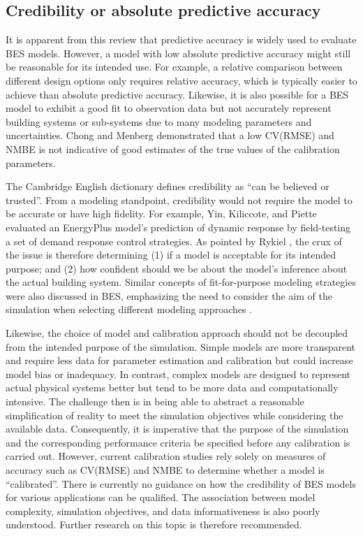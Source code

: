 \documentclass[review]{elsarticle}
\begin{document}
\subsection{Credibility or absolute predictive accuracy} \label{sec:credibility}

It is apparent from this review that predictive accuracy is widely used to evaluate BES models. However, a model with low absolute predictive accuracy might still be reasonable for its intended use. For example, a relative comparison between different design options only requires relative accuracy, which is typically easier to achieve than absolute predictive accuracy. Likewise, it is also possible for a BES model to exhibit a good fit to observation data but not accurately represent building systems or sub-systems due to many modeling parameters and uncertainties. Chong and Menberg \cite{chong2018guidelines} demonstrated that a low CV(RMSE) and NMBE is not indicative of good estimates of the true values of the calibration parameters. 

The Cambridge English dictionary defines credibility as ``can be believed or trusted''. From a modeling standpoint, credibility would not require the model to be accurate or have high fidelity. For example, Yin, Kiliccote, and Piette \cite{yin2016linking} evaluated an EnergyPlus model's prediction of dynamic response by field-testing a set of demand response control strategies. As pointed by Rykiel \cite{rykiel1996testing}, the crux of the issue is therefore determining (1) if a model is acceptable for its intended purpose; and (2) how confident should we be about the model's inference about the actual building system. Similar concepts of fit-for-purpose modeling strategies were also discussed in BES, emphasizing the need to consider the aim of the simulation when selecting different modeling approaches \cite{trvcka2010overview, gaetani2016occupant, gaetani2020stepwise, chong2021occupancy, zhan2021data}. 

Likewise, the choice of model and calibration approach should not be decoupled from the intended purpose of the simulation. Simple models are more transparent and require less data for parameter estimation and calibration but could increase model bias or inadequacy. In contrast, complex models are designed to represent actual physical systems better but tend to be more data and computationally intensive. The challenge then is in being able to abstract a reasonable simplification of reality to meet the simulation objectives while considering the available data. Consequently, it is imperative that the purpose of the simulation and the corresponding performance criteria be specified before any calibration is carried out. However, current calibration studies rely solely on measures of accuracy such as CV(RMSE) and NMBE to determine whether a model is ``calibrated''. There is currently no guidance on how the credibility of BES models for various applications can be qualified. The association between model complexity, simulation objectives, and data informativeness is also poorly understood. Further research on this topic is therefore recommended. 
\end{document}
